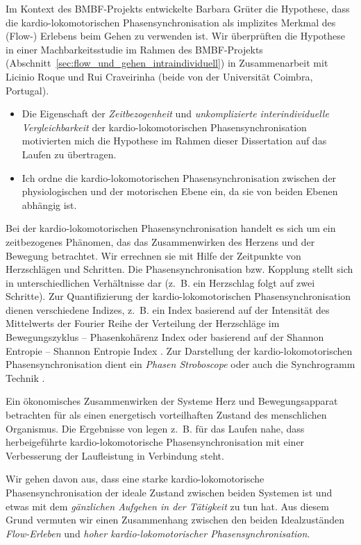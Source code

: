 Im Kontext des \acs{BMBF}-Projekts entwickelte Barbara Grüter die Hypothese, dass die kardio-lokomotorischen Phasensynchronisation als implizites Merkmal des (Flow-) Erlebens beim Gehen zu verwenden ist. Wir überprüften die Hypothese in einer Machbarkeitsstudie im Rahmen des \acs{BMBF}-Projekts (Abschnitt~\ref{sec:flow_und_gehen_intraindividuell}) in Zusammenarbeit mit Licinio Roque und Rui Craveirinha (beide von der Universität Coimbra, Portugal). 
\begin{itemize}
	
	\item Die Eigenschaft der \emph{Zeitbezogenheit} und \emph{unkomplizierte interindividuelle Vergleichbarkeit} der kardio-lokomotorischen Phasensynchronisation motivierten mich die Hypothese im Rahmen dieser Dissertation auf das Laufen zu übertragen.
	
	\item Ich ordne die kardio-lokomotorischen Phasensynchronisation zwischen der physiologischen und der motorischen Ebene ein, da sie von beiden Ebenen abhängig ist.
\end{itemize}

Bei der kardio-lokomotorischen Phasensynchronisation handelt es sich um ein zeitbezogenes Phänomen, das das Zusammenwirken des Herzens und der Bewegung betrachtet. Wir errechnen sie mit Hilfe der Zeitpunkte von Herzschlägen und Schritten. Die Phasensynchronisation bzw. Kopplung stellt sich in unterschiedlichen Verhältnisse dar (z.~B. ein Herzschlag folgt auf zwei Schritte). Zur Quantifizierung der kardio-lokomotorischen Phasensynchronisation dienen verschiedene Indizes, z.~B. ein Index basierend auf der Intensität des Mittelwerts der Fourier Reihe der Verteilung der Herzschläge im Bewegungszyklus -- Phasenkohärenz Index \citep{Rosenblum2003} oder basierend auf der Shannon Entropie -- Shannon Entropie Index \citep{Tass1998, Niizeki2005}. Zur Darstellung der kardio-lokomotorischen Phasensynchronisation dient ein \emph{Phasen Stroboscope} \citep{Mrowka2000} oder auch die Synchrogramm Technik \citep{Schafer1999}.

Ein ökonomisches Zusammenwirken der Systeme Herz und Bewegungsapparat betrachten für \citet[S.~18]{Niizeki2014} als einen energetisch vorteilhaften Zustand des menschlichen Organismus. Die Ergebnisse von \citet{Phillips2013} legen z.~B. für das Laufen nahe, dass herbeigeführte kardio-lokomotorische Phasensynchronisation mit einer Verbesserung der Laufleistung in Verbindung steht.

Wir gehen davon aus, dass eine starke kardio-lokomotorische Phasensynchronisation der ideale Zustand zwischen beiden Systemen ist und etwas mit dem \emph{gänzlichen Aufgehen in der Tätigkeit} zu tun hat. Aus diesem Grund vermuten wir einen Zusammenhang zwischen den beiden Idealzuständen \emph{Flow-Erleben} und \emph{hoher kardio-lokomotorischer Phasensynchronisation}.

